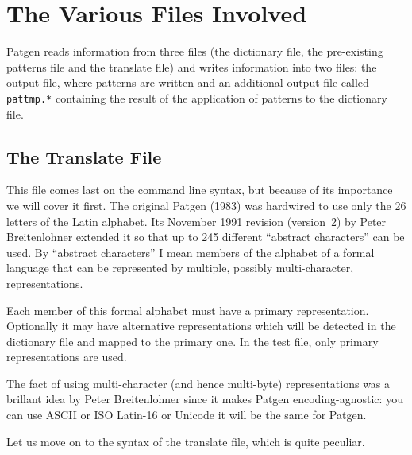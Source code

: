 \documentclass{article}
\begin{document}
\section{The Various Files Involved}

Patgen reads information from three files (the dictionary file, the pre-existing patterns file and the translate file) and writes information into two files: the output file, where patterns are written and an additional output file called \texttt{pattmp.*} containing the result of the application of patterns to the dictionary file.

\subsection{The Translate File}

This file comes last on the command line syntax, but because of its importance we will cover it first. The original Patgen (1983) was hardwired to use only the 26 letters of the Latin alphabet. Its November 1991 revision (version~2) by Peter Breitenlohner extended it so that up to 245 different ``abstract characters'' can be used. By ``abstract characters'' I mean members of the alphabet of a formal language that can be represented by multiple, possibly multi-character, representations.

Each member of this formal alphabet must have a primary representation. Optionally it may have alternative representations which will be detected in the dictionary file and mapped to the primary one. In the test file, only primary representations are used.

The fact of using multi-character (and hence multi-byte) representations was a brillant idea by Peter Breitenlohner since it makes Patgen encoding-agnostic: you can use ASCII or ISO Latin-16 or Unicode it will be the same for Patgen.

\medskip

Let us move on to the syntax of the translate file, which is quite peculiar.
\end{document}
